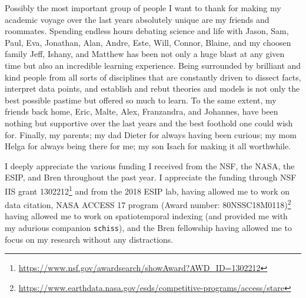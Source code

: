 \begin{acknowledgements}
Possibly the most important group of people I want to thank for making my academic voyage over the last years absolutely unique are my friends and roommates. Spending endless hours debating science and life with Jason, Sam, Paul, Eva, Jonathan, Alan, Andre, Este, Will, Connor, Blaine, and my choosen family Jeff, Ishany, and Matthew has been not only a huge blast at any given time but also an incredible learning experience. Being surrounded by brilliant and kind people from all sorts of disciplines that are constantly driven to dissect facts, interpret data points, and establish and rebut theories and models is not only the best possible pastime but offered so much to learn.
To the same extent, my friends back home, Eric, Malte, Alex, Franzandra, and Johannes, have been nothing but supportive over the last years and the best foothold one could wish for. Finally, my parents; my dad Dieter for always having been curious; my mom Helga for always being there for me; my son Isach for making it all worthwhile.

I deeply appreciate the various funding I received from the \gls{NSF}, the \gls{NASA}, the \gls{ESIP}, and Bren throughout the past year. I appreciate the funding through \gls{NSF} \gls{IIS} grant 1302212\footnote{\url{https://www.nsf.gov/awardsearch/showAward?AWD_ID=1302212}} and from the 2018 \gls{ESIP} lab, having allowed me to work on data citation, \gls{NASA} \gls{ACCESS} 17 program (Award number: 80NSSC18M0118)\footnote{\url{https://www.earthdata.nasa.gov/esds/competitive-programs/access/stare}} having allowed me to work on spatiotemporal indexing (and provided me with my adurious companion \texttt{schiss}), and the Bren fellowship having allowed me to focus on my research without any distractions.
\end{acknowledgements} 
